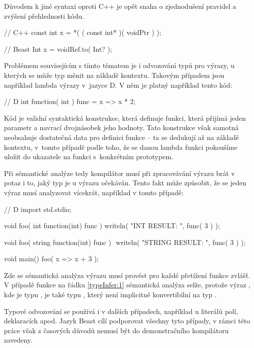 Důvodem k jiné syntaxi oproti C++ je opět snaha o zjednodušení pravidel a zvýšení přehlednosti kódu.

\begin{cppcode}
// C++
const int x = *( ( const int* )( voidPtr ) );
\end{cppcode}

\begin{code}
// Beast
Int x = voidRef.to( Int? );
\end{code}

Problémem souvisejícím s tímto tématem je i odvozování typů pro výrazy, u kterých se může typ měnit na základě kontextu. Takovým případem jsou například lambda výrazy v~jazyce D. V něm je platný například tento kód:

\begin{dcode}
// D
int function( int ) func = x => x * 2;
\end{dcode}

Kód  je validní syntaktická konstrukce, která definuje funkci, která přijímá jeden parametr a navrací dvojnásobek jeho hodnoty. Tato konstrukce však samotná neobsahuje dostatečná data pro definici funkce -- ta se dedukují až na základě kontextu, v~tomto případě podle toho, že se danou lambda funkci pokoušíme uložit do ukazatele na funkci s~konkrétním prototypem.

Při sémantické analýze tedy kompilátor musí při zpracovávání výrazu brát v potaz i to, jaký typ je u výrazu očekáván. Tento fakt může způsobit, že se jeden výraz musí analyzovat vícekrát, například v tomto případě:
\begin{dcode}
// D
import std.stdio;

void foo( int function(int) func ) {
	writeln( "INT RESULT: ", func( 3 ) );
}

void foo( string function(int) func ) { $\label{typeInfer:1}$
	writeln( "STRING RESULT: ", func( 3 ) );
}

void main() {
	foo( x => x + 3 );
}
\end{dcode}

Zde se sémantická analýza výrazu  musí provést pro každé přetížení funkce  zvlášť. V případě funkce na řádku \ref{typeInfer:1} sémantická analýza selže, protože výraz , kde  je typu , je také typu , který není implicitně konvertibilní na typ .

Typové odvozování se používá i v dalších případech, například u literálů polí,  deklaracích apod. Jazyk Beast cílí podporovat všechny tyto případy, v rámci této práce však z časových důvodů nemusí být do demonstračního kompilátoru zavedeny.

